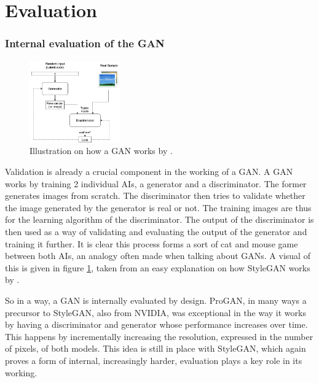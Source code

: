 \part{Evaluation}
\label{part:evaluation}


\section{Internal evaluation of the GAN}
\label{sec:internal_validation}

\begin{figure}
    \centering
    \vspace*{-20pt}
    \includegraphics[width=0.35\textwidth]{images/howganwork.png}
    \captionsetup{justification=centering}
    \caption{Illustration on how a GAN works by \citet{how_gan_works}.}
    \label{fig:howganworks}
\end{figure}

Validation is already a crucial component in the working of a GAN.
A GAN works by training 2 individual AIs, a generator and a discriminator.
The former generates images from scratch.
The discriminator then tries to validate whether the image generated by the generator is real or not.
The training images are thus for the learning algorithm of the discriminator.
The output of the discriminator is then used as a way of validating and evaluating the output of the generator and training it further.
It is clear this process forms a sort of cat and mouse game between both AIs, an analogy often made when talking about GANs.
A visual of this is given in figure \ref{fig:howganworks}, taken from an easy explanation on how StyleGAN works by \citet{how_gan_works}.

So in a way, a GAN is internally evaluated by design.
ProGAN, in many ways a precursor to StyleGAN, also from NVIDIA, was exceptional in the way it works by having a discriminator and generator whose performance increases over time.
This happens by incrementally increasing the resolution, expressed in the number of pixels, of both models.
This idea is still in place with StyleGAN, which again proves a form of internal, increasingly harder, evaluation plays a key role in its working.

